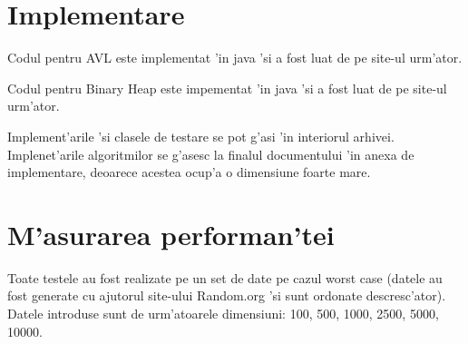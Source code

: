 \documentclass[titlepage,12pt]{article}
\numberwithin{figure}{section}
\begin{document}
\section{Implementare}
\par Codul pentru AVL este implementat 'in java 'si a fost luat de pe site-ul urm'ator\cite{AVL}.
\par Codul pentru Binary Heap este impementat 'in java 'si a fost luat de pe site-ul urm'ator\cite{BIN}.
\par Implement'arile 'si clasele de testare se pot g'asi 'in interiorul arhivei. Implenet'arile algoritmilor se g'asesc la finalul documentului 'in anexa de implementare, deoarece acestea ocup'a o dimensiune foarte mare.

\section{M'asurarea performan'tei}
\par Toate testele au fost realizate pe un set de date pe cazul worst case (datele au fost generate cu ajutorul site-ului Random.org\cite{ran} 'si sunt ordonate descresc'ator). Datele introduse sunt de urm'atoarele dimensiuni: 100, 500, 1000, 2500, 5000, 10000.
\end{document}
